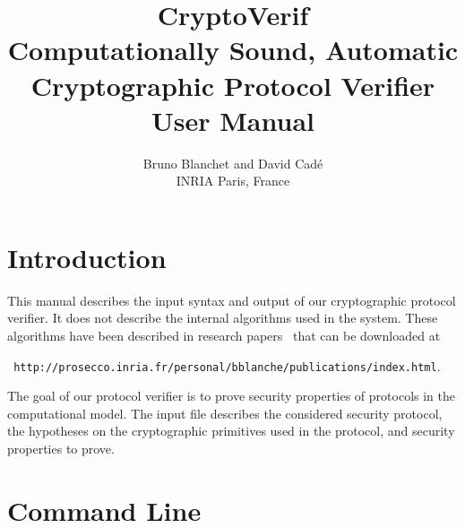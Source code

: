 \documentclass{article}
\begin{document}
\title{CryptoVerif\\
Computationally Sound, Automatic\\
Cryptographic Protocol Verifier\\
User Manual}

\author{Bruno Blanchet and David Cad{\'e}\\
INRIA Paris, France}

\maketitle

\tableofcontents

\section{Introduction}

This manual describes the input syntax and output of our cryptographic
protocol verifier. It does not describe the internal algorithms used
in the system. These algorithms have been described in research
papers~\cite{Blanchet06,BlanchetEPrint05,Blanchet06b,BlanchetPointchevalEPrint06}
that can be downloaded at

\centerline{{\tt
http://prosecco.inria.fr/personal/bblanche/publications/index.html}.}

The goal of our protocol verifier is to prove security properties
of protocols in the computational model. The input file describes
the considered security protocol, the hypotheses on the cryptographic
primitives used in the protocol, and security properties to prove.

\section{Command Line}
\end{document}
